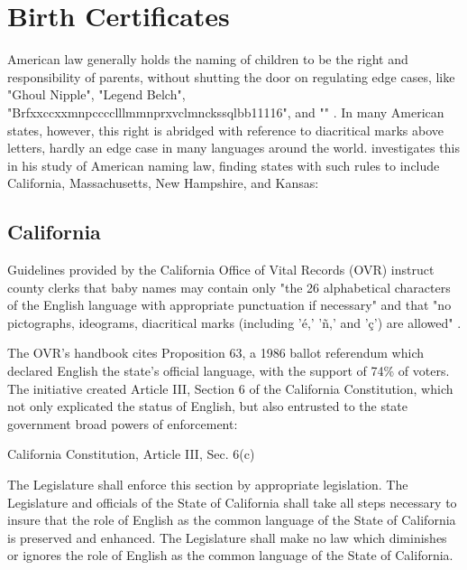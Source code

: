 \section{Birth Certificates}

American law generally holds the naming of children to be the right and
responsibility of parents, without shutting the door on regulating edge cases,
like "Ghoul Nipple", "Legend Belch",
"Brfxxccxxmnpcccclllmmnprxvclmnckssqlbb11116", and "" \parencite{larson11}. In
many American states, however, this right is abridged with reference to
diacritical marks above letters, hardly an edge case in many languages around
the world. \textcite[5]{larson11} investigates this in his study of American naming
law, finding states with such rules to include California, Massachusetts, New
Hampshire, and Kansas:

\subsection{California}

Guidelines provided by the California Office of Vital Records (OVR) instruct
county clerks that baby names may contain only "the 26 alphabetical characters
of the English language with appropriate punctuation if necessary" and that "no
pictographs, ideograms, diacritical marks (including 'é,' 'ñ,' and 'ç') are
allowed" \parencite{larson11}.

The OVR's handbook cites Proposition 63, a 1986 ballot referendum which declared
English the state's official language, with the support of 74\% of voters. The
initiative created Article III, Section 6 of the California Constitution, which
not only explicated the status of English, but also entrusted to the state
government broad powers of enforcement: 

\begin{aquote}{California Constitution, Article III, Sec. 6(c)}

The Legislature shall enforce this section by appropriate legislation. The
Legislature and officials of the State of California shall take all steps
necessary to insure that the role of English as the common language of the State
of California is preserved and enhanced. The Legislature shall make no law which
diminishes or ignores the role of English as the common language of the State of
California.

\end{aquote}

